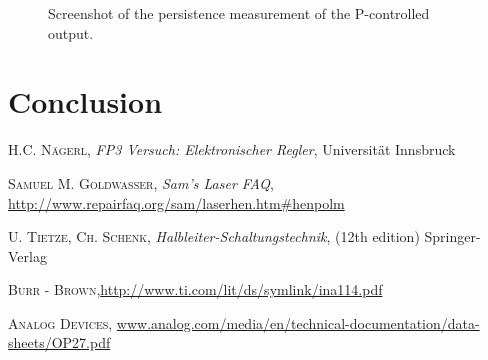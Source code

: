\documentclass[a4paper,10pt]{article}
\begin{document}
\begin{figure}[htp!]
\begin{subfigure}[t]{0.45 \textwidth}
    \caption{ }
  \end{subfigure}
  \caption{Screenshot of the persistence measurement of the P-controlled output. }
  \label{fig_width_pid}
\end{figure}

\section{Conclusion}

\begin{thebibliography}{99}
\textsc{H.C. Nägerl}, \textit{FP3 Versuch: Elektronischer Regler}, Universität Innsbruck

\textsc{Samuel M. Goldwasser}, \textit{Sam's Laser FAQ}, \url{http://www.repairfaq.org/sam/laserhen.htm#henpolm}

\textsc{U. Tietze, Ch. Schenk}, \textit{Halbleiter-Schaltungstechnik}, (12th edition) Springer-Verlag

\textsc{Burr - Brown},\url{http://www.ti.com/lit/ds/symlink/ina114.pdf}

\textsc{Analog Devices}, \url{www.analog.com/media/en/technical-documentation/data-sheets/OP27.pdf}
\end{thebibliography}
\end{document}
